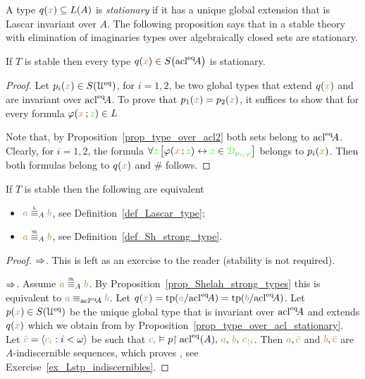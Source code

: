 \documentclass[creche.tex]{subfiles}
\begin{document}
A type $q({\color{brown} x})\subseteq L(A)$ is \emph{stationary\/} if it has a unique global extension that is Lascar invariant over $A$. The following proposition says that in a stable theory with elimination of imaginaries types over algebraically closed sets are stationary.

\begin{proposition}\label{prop_type_over_acl_stationary} If $T$ is stable then every type $q({\color{brown} x})\in S\big({\rm acl}^{{\rm eq}}\!A\big)$ is stationary.
\end{proposition}

\begin{proof}
Let $p_i({\color{brown} x})\in S(\EuScript U^{{\rm eq}})$, for $i=1,2$, be two global types that extend $q({\color{brown} x})$ and are invariant over ${\rm acl}^{{\rm eq}}\!A$. To prove that $p_1({\color{brown} x}) =p_2({\color{brown} x})$, it suffices to show that for every formula $\varphi({\color{brown} x}\,;{\color{green} z})\in L$


Note that, by Proposition~\ref{prop_type_over_acl2} both sets belong to  ${\rm acl}^{{\rm eq}}\!A$. Clearly, for $i=1,2$, the formula $\forall{\color{green}z}\,\big[\varphi({\color{brown} x}\,;{\color{green} z})\leftrightarrow {\color{green}z}\in {\color{green}\EuScript D_{p_i,\,\varphi}}\big]$ belongs to $p_i({\color{brown} x})$. Then both formulas belong to $q({\color{brown} x})$ and $\#$ follows.
\end{proof}

\begin{corollary}
If $T$ is stable then the following are equivalent
\begin{itemize}
\item[1.] ${\mr a}\equivL_A{\mr b}$, see Definition~\ref{def_Lascar_type};
\item[2.] ${\mr a}\equivSh_A{\mr b}$, see Definition~\ref{def_Sh_strong_type}.
\end{itemize}
\end{corollary}
\begin{proof}$\Rightarrow$. This is left as an exercise to the reader (stability is not required).

$\Rightarrow$. Assume ${\mr a}\equivSh_A{\mr b}$. By Proposition~\ref{prop_Shelah_strong_types} this is equivalent to ${\color{brown} a}\equiv_{{\rm acl}^{{\rm eq}}\!A}{\color{brown} b}$. Let $q({\color{brown} x})={\rm tp}({\color{brown} a}/{{\rm acl}}^{{\rm eq}}\!A)={\rm tp}({\color{brown} b}/{{\rm acl}}^{{\rm eq}}\!A)$. Let $p({\color{brown} x})\in S(\EuScript U^{{\rm eq}})$ be the unique global type that is invariant over ${\rm acl}^{{\rm eq}}\! A$ and extends $q({\color{brown} x})$ which we obtain from by Proposition~\ref{prop_type_over_acl_stationary}. Let ${\color{brown}\bar c}=\langle{\color{brown}c_i}:i<\omega\rangle$ be such that ${\color{brown} c_i}\vDash p{\restriction {\rm acl}^{{\rm eq}}(A),\,{\color{brown} a},\,{\color{brown} b},\,{\color{brown} c_{\restriction i}}}$. Then ${\color{brown} a},{\color{brown}\bar c}$ and ${\color{brown} b},{\color{brown}\bar c}$ are $A$-indiscernible sequences, which proves , see Exercise~\ref{ex_Lstp_indiscernibles}.
\end{proof}
\end{document}
